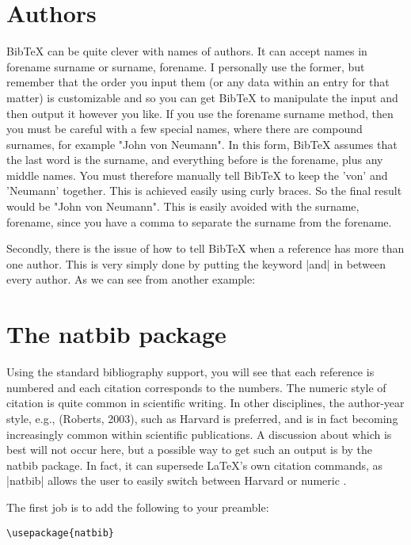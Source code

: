 \section{Authors}

BibTeX can be quite clever with names of authors. It can accept names in forename surname or surname, forename. I personally use the former, but remember that the order you input them (or any data within an entry for that matter) is customizable and so you can get BibTeX to manipulate the input and then output it however you like. If you use the forename surname method, then you must be careful with a few special names, where there are compound surnames, for example "John von Neumann". In this form, BibTeX assumes that the last word is the surname, and everything before is the forename, plus any middle names. You must therefore manually tell BibTeX to keep the 'von' and 'Neumann' together. This is achieved easily using curly braces. So the final result would be "John {von Neumann}". This is easily avoided with the surname, forename, since you have a comma to separate the surname from the forename.

Secondly, there is the issue of how to tell BibTeX when a reference has more than one author. This is very simply done by putting the keyword |and| in between every author. As we can see from another example:


\section{The natbib package}

Using the standard \latex bibliography support, you will see that each reference is numbered and each citation corresponds to the numbers. The numeric style of citation is quite common in scientific writing. In other disciplines, the author-year style, e.g., (Roberts, 2003), such as Harvard is preferred, and is in fact becoming increasingly common within scientific publications. A discussion about which is best will not occur here, but a possible way to get such an output is by the natbib package. In fact, it can supersede LaTeX's own citation commands, as |natbib| allows the user to easily switch between Harvard or numeric \citep{natbib2009}.


The first job is to add the following to your preamble:

\begin{Verbatim}
\usepackage{natbib}
\end{Verbatim}


